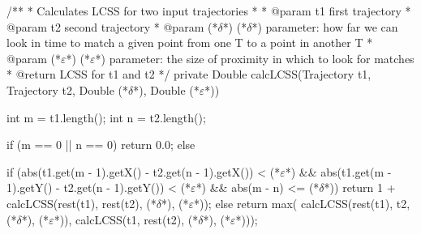 /**
* Calculates LCSS for two input trajectories
*
* @param t1			first trajectory
* @param t2			second trajectory
* @param (*$\delta$*)			 (*$\delta$*) parameter: how far we can look in time to match a given point from one T to a point in another T
* @param (*$\varepsilon$*)			 (*$\varepsilon$*) parameter: the size of proximity in which to look for matches
* @return 			LCSS for t1 and t2
*/
private Double calcLCSS(Trajectory t1, Trajectory t2, Double (*$\delta$*), Double (*$\varepsilon$*)) {
	int m = t1.length();
	int n = t2.length();
	
	if (m == 0 || n == 0) {
		return 0.0;
	} else 
	
	if (abs(t1.get(m - 1).getX() - t2.get(n - 1).getX()) < (*$\varepsilon$*)
			&& abs(t1.get(m - 1).getY() - t2.get(n - 1).getY()) < (*$\varepsilon$*)
			&& abs(m - n) <= (*$\delta$*)) {
		return 1 + calcLCSS(rest(t1), rest(t2), (*$\delta$*), (*$\varepsilon$*));
	} else {
		return max(
			calcLCSS(rest(t1), t2, (*$\delta$*), (*$\varepsilon$*)), 
			calcLCSS(t1, rest(t2), (*$\delta$*), (*$\varepsilon$*)));
	}
}